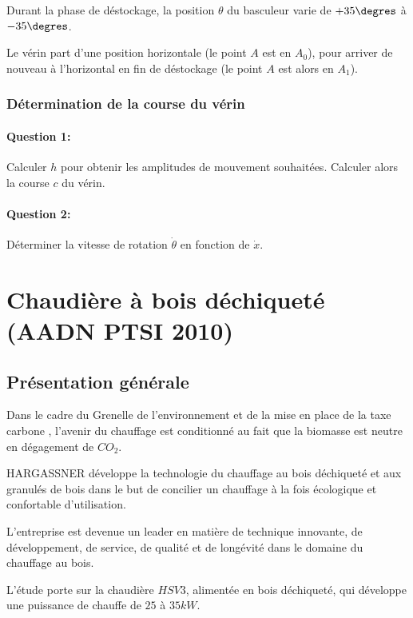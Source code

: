 Durant la phase de déstockage, la position $\theta$ du basculeur varie de $+35\degres$ à $-35\degres$.

Le vérin part d'une position horizontale (le point $A$ est en $A_0$), pour arriver de nouveau à l'horizontal en fin de déstockage (le point $A$ est alors en $A_1$).

\subsubsection{Détermination de la course du vérin}

\paragraph{Question 1:} Calculer $h$ pour obtenir les amplitudes de mouvement souhaitées. Calculer alors la course $c$ du vérin.

\paragraph{Question 2:} Déterminer la vitesse de rotation $\dot{\theta}$ en fonction de $\dot{x}$.

\newpage

\section{Chaudière à bois déchiqueté (AADN PTSI 2010)}

\subsection{Présentation générale}

Dans le cadre du \og Grenelle de l'environnement \fg et de la mise en place de la \og taxe carbone \fg, l'avenir du chauffage est conditionné au fait que la biomasse est neutre en dégagement de $CO_2$.

HARGASSNER développe la technologie du chauffage au bois déchiqueté et aux granulés de bois dans le but de concilier un chauffage à la fois écologique et confortable d'utilisation.

L'entreprise est devenue un leader en matière de technique innovante, de développement, de service, de qualité et de longévité dans le domaine du chauffage au bois.

L'étude porte sur la chaudière $HSV 3$, alimentée en bois déchiqueté, qui développe une puissance de chauffe de $25$ à $35 kW$.

